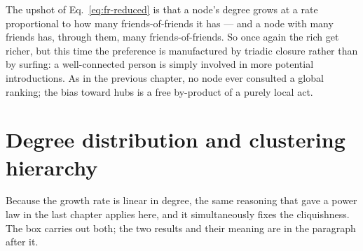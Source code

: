 The upshot of Eq.~\eqref{eq:fr-reduced} is that a node's degree grows at a rate
proportional to how many friends-of-friends it has --- and a node with many
friends has, through them, many friends-of-friends. So once again the rich get
richer, but this time the preference is manufactured by triadic closure rather
than by surfing: a well-connected person is simply involved in more potential
introductions. As in the previous chapter, no node ever consulted a global
ranking; the bias toward hubs is a free by-product of a purely local act.

\section{Degree distribution and clustering hierarchy}

Because the growth rate is linear in degree, the same reasoning that gave a power
law in the last chapter applies here, and it simultaneously fixes the
cliquishness. The box carries out both; the two results and their meaning are in
the paragraph after it.

